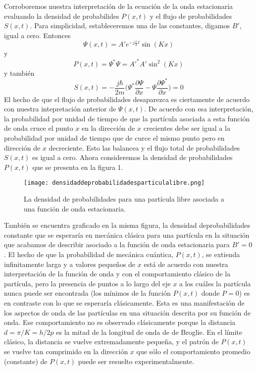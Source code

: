 \documentclass[12pt,a4paper]{article}
\def\e{{\epsilon}} %
\begin{document}
Corroboremos nuestra interpretación de la ecuación de la onda estacionaria evaluando la densidad de probabilides $P(x,t)$ y el flujo de probabilidades $S(x,t)$. Para simplicidad, estableceremos una de las constantes, digamos $B'$, igual a cero. Entonces
\[ \Psi (x,t)=A'e^{-j\frac{\e}{\hbar}t}\sin(Kx) \]
y
\[ P(x,t)=\Psi^{\ast}\Psi=A'^{\ast}A' \sin^{2}(Kx) \]
y también
\[ S(x,t)=-\frac{j \hbar}{2m} \bigg( \Psi^{\ast} \frac{\partial \Psi}{\partial x} - \Psi \frac{\partial \Psi^{\ast}}{\partial x} \bigg)=0 \]
El hecho de que el flujo de probabilidades desaparezca es ciertamente de acuerdo con nuestra intepretación anterior de $\Psi (x,t)$. De acuerdo con esa interpretación, la probabilidad por unidad de tiempo de que la partícula asociada a esta función de onda cruce el punto $x$ en la dirección de $x$ crecientes debe ser igual a la probabilidad por unidad de tiempo que de curce el mismo punto pero en dirección de $x$ decreciente. Esto las balancea y el flujo total de probabilidades $S(x,t)$ es igual a cero. Ahora consideremos la densidad de probabilidades $P(x,t)$ que se presenta en la figura 1.

\begin{figure}[ht!]
\begin{center}
\texttt{[image: densidaddeprobabilidadesparticulalibre.png]}
\caption{La densidad de probabilidades para una partícula libre asociada a una función de onda estacionaria.}
\end{center}
\end{figure}

También se encuentra graficado en la misma figura, la densidad deprobabilidades constante que se esperaría en mecánica clásica para una partícula en la situación que acabamos de describir asociado a la función de onda estacionaria para $B'=0$. El hecho de que la probabilidad de mecánica cuántica, $P(x,t)$, se extienda infinitamente larga y a valores pequeños de $x$ está de acuerdo con nuestra interpretación de la función de onda y con el comportamiento clásico de la partícula, pero la presencia de puntos a lo largo del eje $x$ a los cuáles la partícula nunca puede ser encontrada (los mínimos de la función $P(x,t)$ donde $P=0$) es en contraste con lo que se esperaría clásicamente. Esta es una manifestación de los aspectos de onda de las partículas en una situación descrita por su función de onda. Ese comportamiento no es observado clásicamente porque la distancia $d=\pi/K=h/2p$ es la mitad de la longitud de onda de de Broglie. En el límite clásico, la distancia se vuelve extremadamente pequeña, y el patrón de $P(x,t)$ se vuelve tan comprimido en la dirección $x$ que sólo el comportamiento promedio (constante) de $P(x,t)$ puede ser resuelto experimentalmente.
\end{document}
